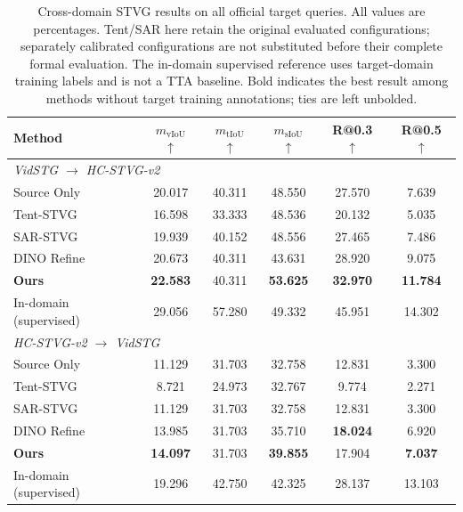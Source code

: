 \documentclass[10pt,twocolumn,letterpaper]{article}
\newcommand{\mvIoU}{\ensuremath{m_{\mathrm{vIoU}}}}
\newcommand{\mtIoU}{\ensuremath{m_{\mathrm{tIoU}}}}
\newcommand{\msIoU}{\ensuremath{m_{\mathrm{sIoU}}}}
\begin{document}
\begin{table}[t]
	\centering
	\caption{Cross-domain STVG results on all official target queries.
		All values are percentages. Tent/SAR here retain the original
        evaluated configurations; separately calibrated configurations are
        not substituted before their complete formal evaluation.
        The in-domain supervised reference
		uses target-domain training labels and is not a TTA baseline.
		Bold indicates the best result among methods without target
		training annotations; ties are left unbolded.}
	\label{tab:cross-domain-main}
	\setlength{\tabcolsep}{8pt}
	\small
	\begin{tabular}{lccccc}
		\toprule
		Method & \mvIoU{} $\uparrow$ & \mtIoU{} $\uparrow$ &
		\msIoU{} $\uparrow$ & R@0.3 $\uparrow$ & R@0.5 $\uparrow$ \\
		\midrule
		\multicolumn{6}{l}{\textit{VidSTG $\rightarrow$ HC-STVG-v2}} \\
		\midrule
		Source Only         & 20.017 & 40.311 & 48.550 & 27.570 & 7.639 \\
		Tent-STVG           & 16.598 & 33.333 & 48.536 & 20.132 & 5.035 \\
		SAR-STVG            & 19.939 & 40.152 & 48.556 & 27.465 & 7.486 \\
		DINO Refine          & 20.673 & 40.311 & 43.631 & 28.920 & 9.075 \\
		\textbf{Ours}       & \textbf{22.583} & 40.311 & \textbf{53.625} &
		\textbf{32.970} & \textbf{11.784} \\
		\midrule
		In-domain (supervised) & 29.056 & 57.280 & 49.332 & 45.951 & 14.302 \\
		\midrule
		\multicolumn{6}{l}{\textit{HC-STVG-v2 $\rightarrow$ VidSTG}} \\
		\midrule
		Source Only         & 11.129 & 31.703 & 32.758 & 12.831 & 3.300 \\
		Tent-STVG           & 8.721 & 24.973 & 32.767 & 9.774 & 2.271 \\
		SAR-STVG            & 11.129 & 31.703 & 32.758 & 12.831 & 3.300 \\
		DINO Refine          & 13.985 & 31.703 & 35.710 & \textbf{18.024} & 6.920 \\
		\textbf{Ours}       & \textbf{14.097} & 31.703 & \textbf{39.855} &
		17.904 & \textbf{7.037} \\
		\midrule
		In-domain (supervised) & 19.296 & 42.750 & 42.325 & 28.137 & 13.103 \\
		\bottomrule
	\end{tabular}
\end{table}
\end{document}
